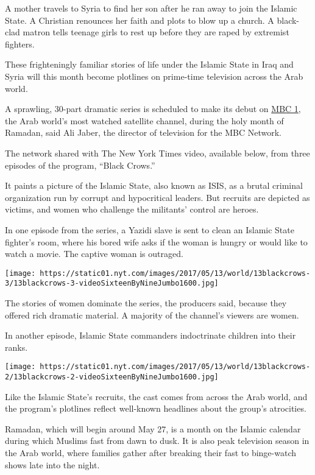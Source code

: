 A mother travels to Syria to find her son after he ran away to join the
Islamic State. A Christian renounces her faith and plots to blow up a
church. A black-clad matron tells teenage girls to rest up before they
are raped by extremist fighters.

These frighteningly familiar stories of life under the Islamic State in
Iraq and Syria will this month become plotlines on prime-time television
across the Arab world.

A sprawling, 30-part dramatic series is scheduled to make its debut on
\href{http://www.mbc.net/en/corporate/channels/mbc1.html}{MBC 1}, the
Arab world's most watched satellite channel, during the holy month of
Ramadan, said Ali Jaber, the director of television for the MBC Network.

The network shared with The New York Times video, available below, from
three episodes of the program, ``Black Crows.''

It paints a picture of the Islamic State, also known as ISIS, as a
brutal criminal organization run by corrupt and hypocritical leaders.
But recruits are depicted as victims, and women who challenge the
militants' control are heroes.

In one episode from the series, a Yazidi slave is sent to clean an
Islamic State fighter's room, where his bored wife asks if the woman is
hungry or would like to watch a movie. The captive woman is outraged.

\texttt{[image: https://static01.nyt.com/images/2017/05/13/world/13blackcrows-3/13blackcrows-3-videoSixteenByNineJumbo1600.jpg]}

The stories of women dominate the series, the producers said, because
they offered rich dramatic material. A majority of the channel's viewers
are women.

In another episode, Islamic State commanders indoctrinate children into
their ranks.

\texttt{[image: https://static01.nyt.com/images/2017/05/13/world/13blackcrows-2/13blackcrows-2-videoSixteenByNineJumbo1600.jpg]}

Like the Islamic State's recruits, the cast comes from across the Arab
world, and the program's plotlines reflect well-known headlines about
the group's atrocities.

Ramadan, which will begin around May 27, is a month on the Islamic
calendar during which Muslims fast from dawn to dusk. It is also peak
television season in the Arab world, where families gather after
breaking their fast to binge-watch shows late into the night.

